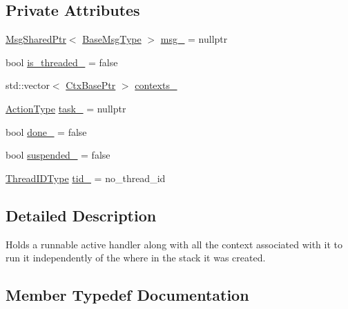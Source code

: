\subsection*{Private Attributes}
\begin{DoxyCompactItemize}
\item 
\hyperlink{namespacevt_ab2b3d506ec8e8d1540aede826d84a239}{Msg\+Shared\+Ptr}$<$ \hyperlink{namespacevt_a44d0d4e144748f2b19a1cfd962f50338}{Base\+Msg\+Type} $>$ \hyperlink{structvt_1_1runnable_1_1_runnable_new_a1998ba5d1d29bada29c94d884f906d11}{msg\+\_\+} = nullptr
\item 
bool \hyperlink{structvt_1_1runnable_1_1_runnable_new_aa29430d7529095b33033112ba405ace7}{is\+\_\+threaded\+\_\+} = false
\item 
std\+::vector$<$ \hyperlink{structvt_1_1runnable_1_1_runnable_new_aba3112ca6cb024a32552569ef0571e20}{Ctx\+Base\+Ptr} $>$ \hyperlink{structvt_1_1runnable_1_1_runnable_new_a3dc86a8be6cfd9537f6d90f3939ac208}{contexts\+\_\+}
\item 
\hyperlink{namespacevt_ae0a5a7b18cc99d7b732cb4d44f46b0f3}{Action\+Type} \hyperlink{structvt_1_1runnable_1_1_runnable_new_a8216711b400b7c1f36c5a9bafaa7133e}{task\+\_\+} = nullptr
\item 
bool \hyperlink{structvt_1_1runnable_1_1_runnable_new_ae296cbcff8fe4f664af37960dd00397e}{done\+\_\+} = false
\item 
bool \hyperlink{structvt_1_1runnable_1_1_runnable_new_a1b20f584aa7a1a09857029532fda1782}{suspended\+\_\+} = false
\item 
\hyperlink{namespacevt_a9b887d814dd25ff495a0c8270304ac02}{Thread\+I\+D\+Type} \hyperlink{structvt_1_1runnable_1_1_runnable_new_ad0e857fdce2f1c13512a1415993cd7fe}{tid\+\_\+} = no\+\_\+thread\+\_\+id
\end{DoxyCompactItemize}


\subsection{Detailed Description}
Holds a runnable active handler along with all the context associated with it to run it independently of the where in the stack it was created. 

\subsection{Member Typedef Documentation}
\mbox{\label{structvt_1_1runnable_1_1_runnable_new_aba3112ca6cb024a32552569ef0571e20}} 
